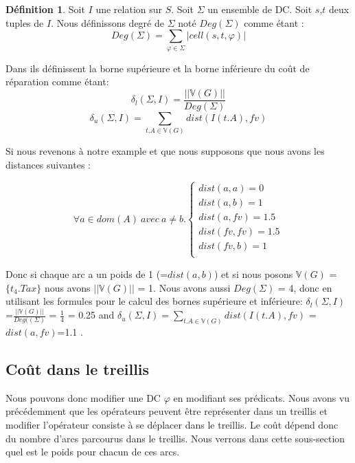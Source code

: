 \documentclass[letterpaper, 12pt]{report}
\theoremstyle{definition}
\newtheorem{mydef}{Définition}
\begin{document}
\begin{mydef}
	Soit $I$ une relation sur $S$. Soit $\Sigma$ un ensemble de DC. Soit $s$,$t$ deux tuples de $I$. Nous définissons degré de $\Sigma$ noté $Deg(\Sigma)$ comme étant : $$Deg(\Sigma) = \sum_{\varphi \in \Sigma} |cell(s,t,\varphi)|$$
\end{mydef}


Dans \cite{main} ils définissent la borne supérieure et la borne inférieure du coût de réparation comme étant:
$$ \delta_l(\Sigma,I) = \frac{||\mathbb{V}(G)||}{Deg(\Sigma)}$$
$$ \delta_u(\Sigma,I) = \sum_{t.A \in \mathbb{V}(G)} dist(I(t.A),fv)$$

Si nous revenons à notre example et que nous supposons que nous avons les distances suivantes :

$$
\forall a \in dom(A) \ avec \ a \neq b.
\left\{
	\begin{array}{ll}
	   dist(a,a)=0\\
	   dist(a,b)=1\\
	   dist(a,fv)=1.5\\
	   dist(fv,fv)=1.5\\
	   dist(fv,b)=1\\
	\end{array}
\right.
$$

Donc si chaque arc a un poids de 1 (=$ dist(a,b)$) et si nous posons $\mathbb{V}(G)$ = $\{t_4.Tax \}$ nous avons $||\mathbb{V}(G)||$ = 1. Nous avons aussi $Deg(\Sigma)$ = 4, donc en utilisant les formules pour le calcul des bornes supérieure et inférieure: $\delta_l(\Sigma,I)$=$\frac{||\mathbb{V}(G)||}{Deg((\Sigma)}$ = $\frac{1}{4}$ = 0.25 and $\delta_u(\Sigma,I) = \sum_{t.A \in \mathbb{V}(G)} dist(I(t.A),fv)$ = $dist(a,fv)$=1.1 .


\subsection{Coût dans le treillis}

Nous pouvons donc modifier une DC $\varphi$ en modifiant ses prédicats. Nous avons vu précédemment que les opérateurs peuvent être représenter dans un treillis et modifier l'opérateur consiste à se déplacer dans le treillis. Le coût dépend donc du nombre d'arcs parcourus dans le treillis. Nous verrons dans cette sous-section quel est le poids pour chacun de ces arcs.\\
\end{document}
